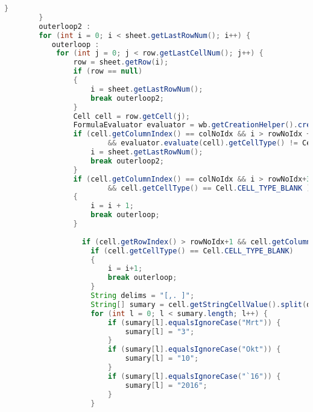 \begin{lstlisting}[language=Java,basicstyle=\tiny,caption=ExcelConverter.java,label=lst:ExcelConverter]
            }
        }
        outerloop2 :
        for (int i = 0; i < sheet.getLastRowNum(); i++) {
           outerloop :
            for (int j = 0; j < row.getLastCellNum(); j++) {
                row = sheet.getRow(i);
                if (row == null)
                {
                    i = sheet.getLastRowNum();
                    break outerloop2;
                }
                Cell cell = row.getCell(j);
                FormulaEvaluator evaluator = wb.getCreationHelper().createFormulaEvaluator();
                if (cell.getColumnIndex() == colNoIdx && i > rowNoIdx + 3 && cell.getCellType() != Cell.CELL_TYPE_BLANK
                        && evaluator.evaluate(cell).getCellType() != Cell.CELL_TYPE_NUMERIC) {
                    i = sheet.getLastRowNum();
                    break outerloop2;
                }
                if (cell.getColumnIndex() == colNoIdx && i > rowNoIdx+3 
                        && cell.getCellType() == Cell.CELL_TYPE_BLANK )
                {
                    i = i + 1;
                    break outerloop;             
                }
       
                  if (cell.getRowIndex() > rowNoIdx+1 && cell.getColumnIndex() == (colNoIdx + 1)) {
                    if (cell.getCellType() == Cell.CELL_TYPE_BLANK)  
                    {
                        i = i+1;
                        break outerloop;
                    }
                    String delims = "[,. ]";
                    String[] sumary = cell.getStringCellValue().split(delims);
                    for (int l = 0; l < sumary.length; l++) {
                        if (sumary[l].equalsIgnoreCase("Mrt")) {
                            sumary[l] = "3";
                        }
                        if (sumary[l].equalsIgnoreCase("Okt")) {
                            sumary[l] = "10";
                        }
                        if (sumary[l].equalsIgnoreCase("`16")) {
                            sumary[l] = "2016";
                        } 
                    }


\end{lstlisting}

